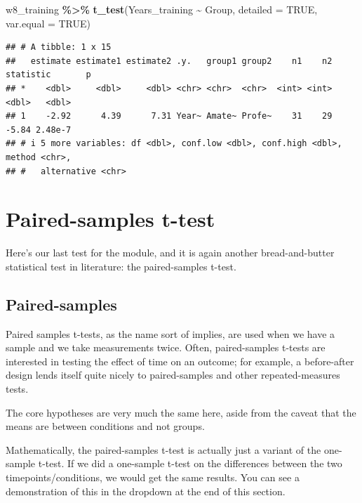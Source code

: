 \documentclass[
]{book}
\newenvironment{Shaded}{\begin{snugshade}}{\end{snugshade}}
\newcommand{\AttributeTok}[1]{\textcolor[rgb]{0.13,0.29,0.53}{#1}}
\newcommand{\ConstantTok}[1]{\textcolor[rgb]{0.56,0.35,0.01}{#1}}
\newcommand{\FunctionTok}[1]{\textcolor[rgb]{0.13,0.29,0.53}{\textbf{#1}}}
\newcommand{\NormalTok}[1]{#1}
\newcommand{\SpecialCharTok}[1]{\textcolor[rgb]{0.81,0.36,0.00}{\textbf{#1}}}
\begin{document}
\begin{Shaded}
\begin{Highlighting}[]
\NormalTok{w8\_training }\SpecialCharTok{\%\textgreater{}\%}
  \FunctionTok{t\_test}\NormalTok{(Years\_training }\SpecialCharTok{\textasciitilde{}}\NormalTok{ Group, }\AttributeTok{detailed =} \ConstantTok{TRUE}\NormalTok{, }\AttributeTok{var.equal =} \ConstantTok{TRUE}\NormalTok{)}
\end{Highlighting}
\end{Shaded}

\begin{verbatim}
## # A tibble: 1 x 15
##   estimate estimate1 estimate2 .y.   group1 group2    n1    n2 statistic       p
## *    <dbl>     <dbl>     <dbl> <chr> <chr>  <chr>  <int> <int>     <dbl>   <dbl>
## 1    -2.92      4.39      7.31 Year~ Amate~ Profe~    31    29     -5.84 2.48e-7
## # i 5 more variables: df <dbl>, conf.low <dbl>, conf.high <dbl>, method <chr>,
## #   alternative <chr>
\end{verbatim}

\hypertarget{paired-samples-t-test}{%
\section{Paired-samples t-test}\label{paired-samples-t-test}}

Here's our last test for the module, and it is again another bread-and-butter statistical test in literature: the paired-samples t-test.

\hypertarget{paired-samples}{%
\subsection{Paired-samples}\label{paired-samples}}

Paired samples t-tests, as the name sort of implies, are used when we have a sample and we take measurements twice. Often, paired-samples t-tests are interested in testing the effect of time on an outcome; for example, a before-after design lends itself quite nicely to paired-samples and other repeated-measures tests.

The core hypotheses are very much the same here, aside from the caveat that the means are between conditions and not groups.

Mathematically, the paired-samples t-test is actually just a variant of the one-sample t-test. If we did a one-sample t-test on the differences between the two timepoints/conditions, we would get the same results. You can see a demonstration of this in the dropdown at the end of this section.
\end{document}
